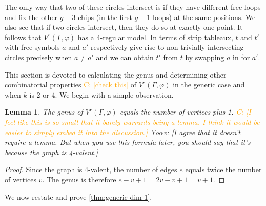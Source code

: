 \documentclass[11pt,reqno]{amsart}
\newcommand{\yoav}[1]{{\color{blue} \sf  Yo$\alpha$v: [#1]}}
\newcommand{\caelan}[1]{\textcolor{orange}{\sf C: [#1]}}
\theoremstyle{definition}
\theoremstyle{problem}
\theoremstyle{plain}
\newtheorem{lemma}[definition]{Lemma}
\theoremstyle{remark}
\theoremstyle{theorem}
\numberwithin{equation}{section}
\numberwithin{figure}{section}
\begin{document}
The only way that two of these circles intersect is if they have
different free loops and fix the other $g-3$ chips (in the first $g-1$
loops) at the same positions.  We also see that if two circles
intersect, then they do so at exactly one point.  It follows that
$V^r(\Gamma,\varphi)$ has a $4$-regular model.  In terms of strip
tableaux, $t$ and $t'$ with free symbols $a$ and $a'$ respectively
give rise to non-trivially intersecting circles precisely when
$a \neq a'$ and we can obtain $t'$ from $t$ by swapping $a$ in for
$a'$.

This section is devoted to calculating the genus and determining other
combinatorial properties \caelan{check this} of $V^r(\Gamma,\varphi)$
in the generic case and when $k$ is 2 or 4.  We begin with a simple
observation.

\begin{lemma}\label{lem:1}
  The genus of $V^r(\Gamma,\varphi)$ equals the number of vertices
  plus 1.  \caelan{I feel like this is so small that it barely
    warrants being a lemma.  I think it would be easier to simply
    embed it into the discussion.} \yoav{I agree that it doesn't require a lemma. But when you use this formula later, you should say that it's because the graph is 4-valent.}
\end{lemma}

\begin{proof}
  Since the graph is $4$-valent, the number of edges $e$ equals twice
  the number of vertices $v$. The genus is therefore
  $e-v+1 = 2v-v+1=v+1$.
\end{proof}


We now restate and prove \cref{thm:generic-dim-1}.

\genericdimone*
\end{document}
